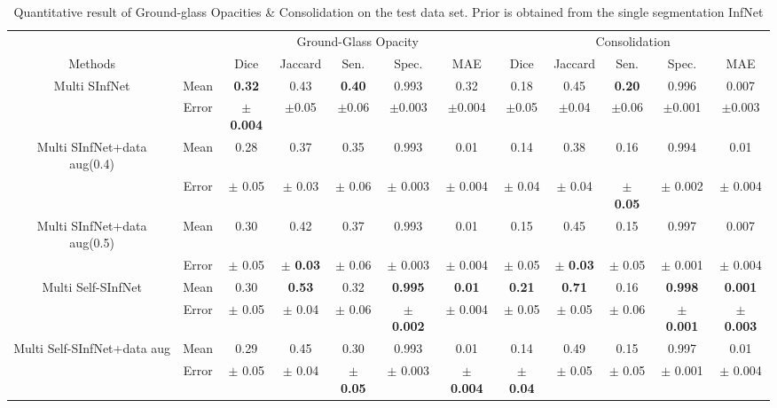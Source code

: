 \begin{table}[!h]
	\small
	\centering
	\begin{tabular}{| c | c || c c c c c || c c c c c |}
		\hline
		& &\multicolumn{5}{c||}{Ground-Glass Opacity} & \multicolumn{5}{c|}{Consolidation}\\ \cline{3-12}
		Methods & & Dice & Jaccard & Sen. & Spec. & MAE & Dice & Jaccard & Sen. & Spec. & MAE \\\hline
		Multi SInfNet & Mean & \textbf{0.32} & 0.43 & \textbf{0.40} & 0.993 & 0.32 & 0.18 & 0.45  & \textbf{0.20} & 0.996 & 0.007  \\ \cline{2-12}
		& Error & $\pm$\textbf{0.004} & $\pm$0.05 & $\pm$0.06 & $\pm$0.003 & $\pm$0.004 & $\pm$0.05 & $\pm$0.04 & $\pm$0.06 & $\pm$0.001 & $\pm$0.003 \\ \hline \hline
		
		Multi SInfNet+data aug(0.4) & Mean & 0.28 & 0.37 & 0.35 & 0.993 & 0.01 & 0.14 & 0.38 & 0.16 & 0.994 & 0.01  \\ \cline{2-12}
		& Error & $\pm$ 0.05 & $\pm$ 0.03 & $\pm$ 0.06 & $\pm$ 0.003 & $\pm$ 0.004 & $\pm$ 0.04 & $\pm$ 0.04 & $\pm$ \textbf{0.05} & $\pm$ 0.002 & $\pm$ 0.004  \\ \hline \hline
		
		Multi SInfNet+data aug(0.5) & Mean & 0.30 & 0.42 & 0.37 & 0.993 & 0.01 & 0.15 & 0.45 & 0.15 & 0.997 & 0.007  \\ \cline{2-12}
		& Error & $\pm$ 0.05 & $\pm$ \textbf{0.03} & $\pm$ 0.06 & $\pm$ 0.003 & $\pm$ 0.004 & $\pm$ 0.05 & $\pm$ \textbf{0.03} & $\pm$ 0.05 & $\pm$ 0.001 & $\pm$ 0.004  \\ \hline \hline
		
		Multi Self-SInfNet & Mean & 0.30 & \textbf{0.53} & 0.32 & \textbf{0.995} & \textbf{0.01} & \textbf{0.21} & \textbf{0.71} & 0.16 & \textbf{0.998} & \textbf{0.001}  \\ \cline{2-12}
		& Error & $\pm$ 0.05 & $\pm$ 0.04 & $\pm$ 0.06 & $\pm$ \textbf{0.002} & $\pm$ 0.004 & $\pm$ 0.05 & $\pm$ 0.05 & $\pm$ 0.06 & $\pm$ \textbf{0.001} & $\pm$ \textbf{0.003}  \\ \hline \hline
		
		Multi Self-SInfNet+data aug & Mean & 0.29 & 0.45 & 0.30 & 0.993 & 0.01 & 0.14 & 0.49 & 0.15 & 0.997 & 0.01  \\ \cline{2-12}
		& Error & $\pm$ 0.05 & $\pm$ 0.04 & $\pm$ \textbf{0.05} & $\pm$ 0.003 & $\pm$ \textbf{0.004} & $\pm$ \textbf{0.04} & $\pm$ 0.05 & $\pm$ 0.05 & $\pm$ 0.001 & $\pm$ 0.004  \\ \hline \hline
	\end{tabular}
	\caption{Quantitative result of Ground-glass Opacities \& Consolidation on the test data set. Prior is obtained from the single segmentation InfNet}
	\label{tab:multi-weakprior}
\end{table}

